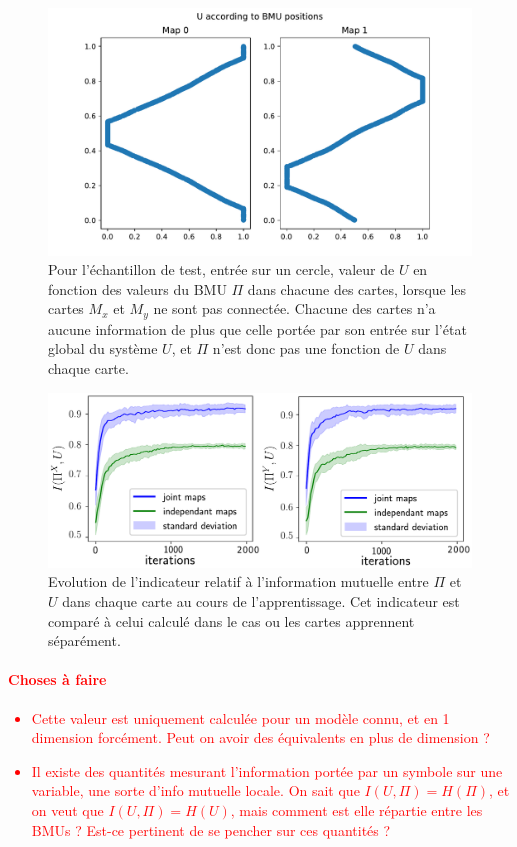 \begin{figure}
\centering
\includegraphics[width = \textwidth]{xu_yu_unco.pdf}
\caption{Pour l'échantillon de test, entrée sur un cercle, valeur de $U$ en fonction des valeurs du BMU $\Pi$ dans chacune des cartes, lorsque les cartes $M_x$ et $M_y$ ne sont pas connectée. Chacune des cartes n'a aucune information de plus que celle portée par son entrée sur l'état global du système $U$, et $\Pi$ n'est donc pas une fonction de $U$ dans chaque carte. }
\label{fig:piu_indep}
\end{figure}

\begin{figure}
\centering
\includegraphics[width=\textwidth]{mutual_info_evol.pdf}
\caption{Evolution de l'indicateur relatif à l'information mutuelle entre $\Pi$ et $U$ dans chaque carte au cours de l'apprentissage. Cet indicateur est comparé à celui calculé dans le cas ou les cartes apprennent séparément.}
\label{fig:im} 
\end{figure}

\textcolor{red}{
\paragraph{Choses à faire}
\begin{itemize}
\item Cette valeur est uniquement calculée pour un modèle connu, et en 1 dimension forcément. Peut on avoir des équivalents en plus de dimension ? 
\item Il existe des quantités mesurant l'information portée par un symbole sur une variable, une sorte d'info mutuelle locale. On sait que $I(U,\Pi) = H(\Pi)$, et on veut que $I(U,\Pi) = H(U)$, mais comment est elle répartie entre les BMUs ? Est-ce pertinent de se pencher sur ces quantités ? 
\end{itemize}
}



